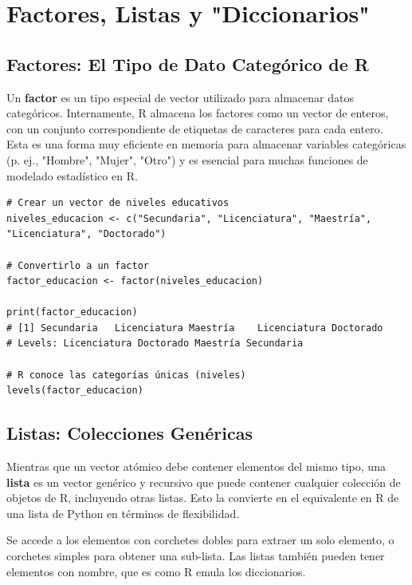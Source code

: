 \section{Factores, Listas y "Diccionarios"}
\label{sec:r_factors_lists}

\subsection*{Factores: El Tipo de Dato Categórico de R}
Un \textbf{factor} es un tipo especial de vector utilizado para almacenar datos categóricos. Internamente, R almacena los factores como un vector de enteros, con un conjunto correspondiente de etiquetas de caracteres para cada entero. Esta es una forma muy eficiente en memoria para almacenar variables categóricas (p. ej., "Hombre", "Mujer", "Otro") y es esencial para muchas funciones de modelado estadístico en R.

\begin{verbatim}
# Crear un vector de niveles educativos
niveles_educacion <- c("Secundaria", "Licenciatura", "Maestría", "Licenciatura", "Doctorado")

# Convertirlo a un factor
factor_educacion <- factor(niveles_educacion)

print(factor_educacion)
# [1] Secundaria   Licenciatura Maestría    Licenciatura Doctorado
# Levels: Licenciatura Doctorado Maestría Secundaria

# R conoce las categorías únicas (niveles)
levels(factor_educacion)
\end{verbatim}

\subsection*{Listas: Colecciones Genéricas}
Mientras que un vector atómico debe contener elementos del mismo tipo, una \textbf{lista} es un vector genérico y recursivo que puede contener cualquier colección de objetos de R, incluyendo otras listas. Esto la convierte en el equivalente en R de una lista de Python en términos de flexibilidad.

Se accede a los elementos con corchetes dobles \rcode{[[...]]} para extraer un solo elemento, o corchetes simples \rcode{[...]} para obtener una sub-lista. Las listas también pueden tener elementos con nombre, que es como R emula los diccionarios.

